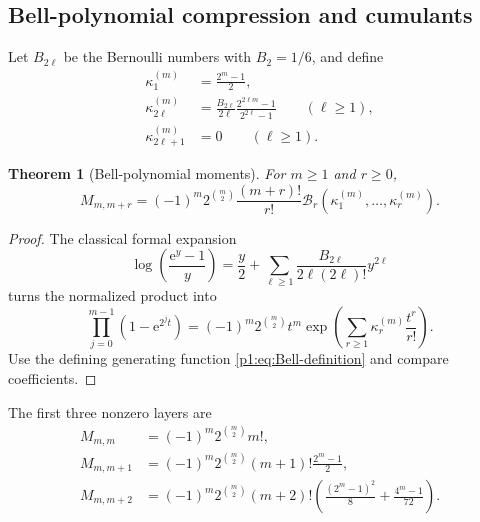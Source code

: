 \documentclass[11pt,oneside]{article}
\numberwithin{equation}{section}
\newtheorem{theorem}{Theorem}[section]
\theoremstyle{definition}
\theoremstyle{remark}
\newcommand{\e}{\mathrm e}
\newcommand{\Bell}{\mathcal B}
\begin{document}
\subsection{Bell-polynomial compression and cumulants}

Let \(B_{2\ell}\) be the Bernoulli numbers with \(B_2=1/6\), and define
\begin{align}
 \kappa_1^{(m)}&=\frac{2^m-1}{2},
 \label{p1:eq:kappa-one}\\
 \kappa_{2\ell}^{(m)}
 &=\frac{B_{2\ell}}{2\ell}
   \frac{2^{2\ell m}-1}{2^{2\ell}-1}
   \qquad(\ell\ge1),
 \label{p1:eq:kappa-even}\\
 \kappa_{2\ell+1}^{(m)}&=0
   \qquad(\ell\ge1).
 \label{p1:eq:kappa-odd}
\end{align}

\begin{theorem}[Bell-polynomial moments]
\label{p1:thm:Bell-moments}
For \(m\ge1\) and \(r\ge0\),
\begin{equation}
  \boxed{
  M_{m,m+r}=(-1)^m2^{\binom m2}
    \frac{(m+r)!}{r!}
    \Bell_r\!\left(
       \kappa_1^{(m)},\ldots,\kappa_r^{(m)}
    \right).}
  \label{p1:eq:Bell-moments}
\end{equation}
\end{theorem}

\begin{proof}
The classical formal expansion
\begin{equation}
  \log\!\left(\frac{\e^y-1}{y}\right)
  =\frac y2+
   \sum_{\ell\ge1}
   \frac{B_{2\ell}}{2\ell(2\ell)!}y^{2\ell}
  \label{p1:eq:log-expm1}
\end{equation}
turns the normalized product into
\begin{equation}
 \prod_{j=0}^{m-1}(1-\e^{2^jt})
 =(-1)^m2^{\binom m2}t^m
  \exp\!\left(
    \sum_{r\ge1}\kappa_r^{(m)}\frac{t^r}{r!}
  \right).
  \label{p1:eq:moment-Bell-factor}
\end{equation}
Use the defining generating function \eqref{p1:eq:Bell-definition} and compare
coefficients.
\end{proof}

The first three nonzero layers are
\begin{align}
 M_{m,m}
 &=(-1)^m2^{\binom m2}m!,
 \label{p1:eq:moment-layer0}\\
 M_{m,m+1}
 &=(-1)^m2^{\binom m2}(m+1)!\frac{2^m-1}{2},
 \label{p1:eq:moment-layer1}\\
 M_{m,m+2}
 &=(-1)^m2^{\binom m2}(m+2)!
   \left(
     \frac{(2^m-1)^2}{8}+\frac{4^m-1}{72}
   \right).
 \label{p1:eq:moment-layer2}
\end{align}
\end{document}
